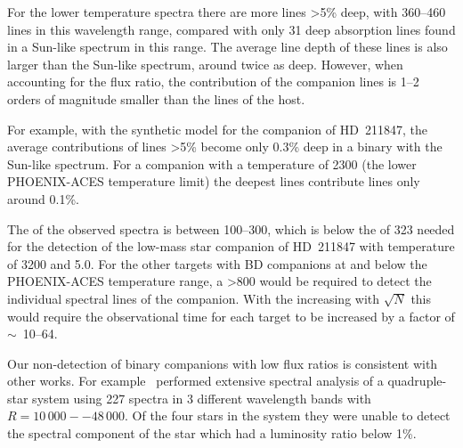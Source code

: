 For the lower temperature spectra there are more lines >5\% deep, with 360--460 lines in this wavelength range, compared with only 31 deep absorption lines found in a Sun-like spectrum in this range.
The average line depth of these lines is also larger than the Sun-like spectrum, around twice as deep.
However, when accounting for the flux ratio, the contribution of the companion lines is 1--2 orders of magnitude smaller than the lines of the host.

For example, with the synthetic model for the companion of {HD~211847}, the average contributions of lines >5\% become only 0.3\% deep in a binary with the Sun-like spectrum.
For a companion with a temperature of 2300\K{} (the lower {PHOENIX-ACES} temperature limit) the deepest lines contribute lines only around 0.1\%.


The \snr{} of the observed spectra is between 100--300, which is below the \snr{} of 323 needed for the detection of the low-mass star companion of {HD~211847} with temperature of 3200\K{} and \Logg{} 5.0.
For the other targets with {BD} companions at and below the {PHOENIX-ACES} temperature range, a \snr{} >800  would be required to detect the individual spectral lines of the companion.
With the \snr{} increasing with \(\sqrt{N}\) this would require the observational time for each target to be increased by a factor of \(\sim\)~10--64.

Our non-detection of binary companions with low flux ratios is consistent with other works.
For example~\citet{nemravova_xtauri_2016} performed extensive spectral analysis of a quadruple-star system  using 227 spectra in 3 different wavelength bands with \(R=10\,000--48\,000\).
Of the four stars in the system they were unable to detect the spectral component of the star which had a luminosity ratio below 1\%.




